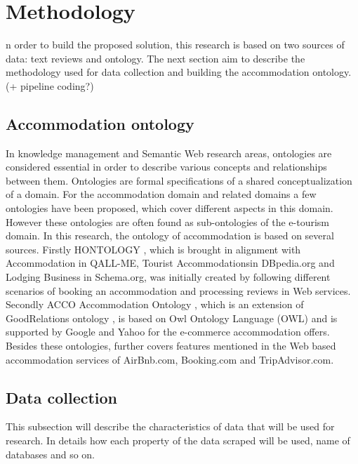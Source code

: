 %
%
\let\textcircled=\pgftextcircled
\chapter{Methodology}
\label{chap:methods}

n order to build the proposed solution, this research is based on two sources of data: text reviews and ontology. The next section aim to describe the methodology used for data collection and building the accommodation ontology. (+ pipeline coding?)

\section{Accommodation ontology} 
In knowledge management and Semantic Web research areas, ontologies are considered essential in order to describe various concepts and relationships between them. Ontologies are formal specifications of a shared conceptualization of a domain. For the accommodation domain and related domains a few ontologies have been proposed, which cover different aspects in this domain. However these ontologies are often found as sub-ontologies of the e-tourism domain. In this research, the ontology of accommodation is based on several sources. Firstly HONTOLOGY \cite{chaves2012hontology}, which is brought in alignment with Accommodation in QALL-ME, Tourist Accommodationsin DBpedia.org and Lodging Business  in Schema.org, was initially created by following different scenarios of booking an accommodation and processing reviews in Web services. Secondly ACCO Accommodation Ontology \cite{hepp2013accommodation}, which is an extension of GoodRelations ontology \cite{hepp2008goodrelations}, is based on Owl Ontology Language (OWL) and is supported by Google and Yahoo for the e-commerce accommodation offers.
Besides these ontologies,  further covers features mentioned in the Web based accommodation services of AirBnb.com, Booking.com and TripAdvisor.com.


\section{Data collection}
This subsection will describe the characteristics of data that will be used for research. In details how each property of the data scraped will be used, name of databases and so on.
